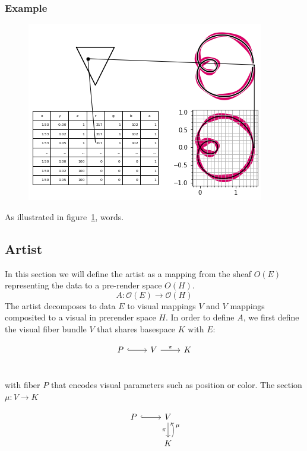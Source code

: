 \documentclass[../main.tex]{subfiles}
\begin{document}
\subsubsection{{Example}}
\begin{figure}[h]
    \includegraphics[width=.4\linewidth]{figures/sections/math/render.png}
    \caption{}
    \label{fig:render}
\end{figure}

As illustrated in figure~\ref{fig:render}, words.

\subsection{Artist}

In this section we will define the artist as a mapping from the sheaf $O(E)$ representing the data to a pre-render space $O(H)$. 
\begin{equation}
    A: \mathcal{O}(E) \rightarrow \mathcal{O}(H)
\end{equation}
The artist decomposes to data $E$ to visual mappings $V$ and $V$ mappings composited to a visual in prerender space $H$. In order to define $A$, we first define the visual fiber bundle $V$ that shares basespace $K$ with $E$:

\begin{equation}
    \begin{tikzcd}
        P \arrow[r, hook] & V \arrow[r, "\pi"] & K\\   
    \end{tikzcd}
\end{equation}

with fiber $P$ that encodes visual parameters such as position or color. The section $\mu: V \rightarrow K$

\begin{equation}
    \begin{tikzcd}
        P \arrow[r, hook] & V \arrow[d, "\pi"']              \\
                          & K \arrow[u, "\mu"', bend right]
        \end{tikzcd}
\end{equation}
\end{document}

